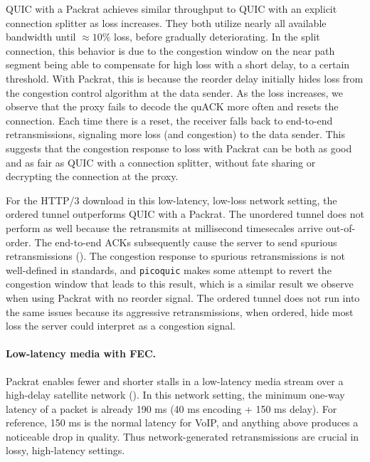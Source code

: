 QUIC with a Packrat achieves similar throughput to QUIC with an explicit
connection splitter as loss increases. They both utilize nearly all available
bandwidth until $\approx\!10\%$ loss, before gradually deteriorating. In the
split connection, this behavior is due to the congestion window on the near
path segment being able to compensate for high loss with a short delay, to a
certain threshold. With Packrat, this is because the reorder delay initially
hides loss from the congestion control algorithm at the data sender. As the
loss increases, we observe that the proxy fails to decode the quACK more often
and resets the connection. Each time there is a reset, the receiver falls back
to end-to-end retransmissions, signaling more loss (and congestion) to the data
sender. This suggests that the congestion response to loss with Packrat can be
both as good and as fair as QUIC with a connection splitter, without fate
sharing or decrypting the connection at the proxy.



For the HTTP/3 download in this low-latency, low-loss network setting, the
ordered tunnel outperforms QUIC with a Packrat. The unordered tunnel does not
perform as well because the retransmits at millisecond timesecales arrive
out-of-order. The end-to-end ACKs subsequently cause the server to send
spurious retransmissions (). The congestion response to
spurious retransmissions is not well-defined in standards, and \texttt
{picoquic} makes some attempt to revert the congestion window that leads to
this result, which is a similar result we observe when using Packrat with no
reorder signal. The ordered tunnel does not run into the same issues because
its aggressive retransmissions, when ordered, hide most loss the server could
interpret as a congestion signal.

\paragraph{Low-latency media with FEC.}

Packrat enables fewer and shorter stalls in a low-latency media stream over a
high-delay satellite network (). In this network setting,
the minimum one-way latency of a packet is already 190 ms (40 ms encoding + 150
ms delay). For reference, 150 ms is the normal latency for VoIP, and anything
above produces a noticeable drop in quality. Thus network-generated
retransmissions are crucial in lossy, high-latency settings.

